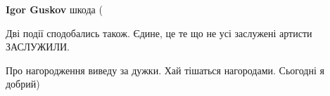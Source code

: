 \begin{itemize}
\begin{itemize}
\textbf{Igor Guskov} шкода (
\end{itemize}

 
Дві події сподобались також. Єдине, це те що не усі заслужені артисти ЗАСЛУЖИЛИ.

\begin{itemize}
 
Про нагородження виведу за дужки. Хай тішаться нагородами. Сьогодні я добрий)
\end{itemize}

\end{itemize}

